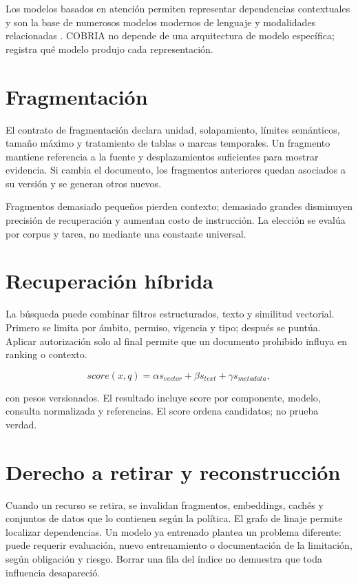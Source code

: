 Los modelos basados en atención permiten representar dependencias contextuales y son la
base de numerosos modelos modernos de lenguaje y modalidades relacionadas
\parencite{vaswani2017attention}. COBRIA no depende de una arquitectura de modelo
específica; registra qué modelo produjo cada representación.

\section{Fragmentación}

El contrato de fragmentación declara unidad, solapamiento, límites semánticos, tamaño
máximo y tratamiento de tablas o marcas temporales. Un fragmento mantiene referencia a
la fuente y desplazamientos suficientes para mostrar evidencia. Si cambia el documento, los
fragmentos anteriores quedan asociados a su versión y se generan otros nuevos.

Fragmentos demasiado pequeños pierden contexto; demasiado grandes disminuyen precisión
de recuperación y aumentan costo de instrucción. La elección se evalúa por corpus y tarea,
no mediante una constante universal.

\section{Recuperación híbrida}

La búsqueda puede combinar filtros estructurados, texto y similitud vectorial. Primero
se limita por ámbito, permiso, vigencia y tipo; después se puntúa. Aplicar autorización
solo al final permite que un documento prohibido influya en ranking o contexto.

\begin{equation}
score(x,q)=\alpha s_{vector}+\beta s_{text}+\gamma s_{metadata},
\end{equation}

con pesos versionados. El resultado incluye score por componente, modelo, consulta
normalizada y referencias. El score ordena candidatos; no prueba verdad.

\section{Derecho a retirar y reconstrucción}

Cuando un recurso se retira, se invalidan fragmentos, embeddings, cachés y conjuntos de datos que
lo contienen según la política. El grafo de linaje permite localizar dependencias. Un
modelo ya entrenado plantea un problema diferente: puede requerir evaluación, nuevo
entrenamiento o documentación de la limitación, según obligación y riesgo. Borrar una
fila del índice no demuestra que toda influencia desapareció.


